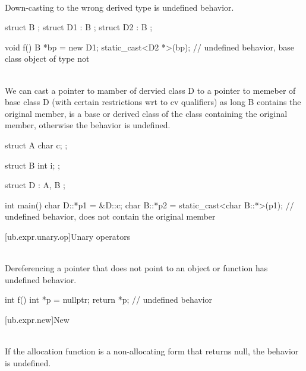 \pnum
{} \\
Down-casting to the wrong derived type is undefined behavior.

\pnum
\begin{example}
\begin{codeblock}
struct B {};
struct D1 : B {};
struct D2 : B {};

void f() {
  B *bp = new D1;
  static_cast<D2 *>(bp);        // undefined behavior, base class object of type  not 
}
\end{codeblock}
\end{example}

\pnum
{} \\
We can cast a pointer to mamber of dervied class D to a pointer to memeber of base class D (with certain restrictions wrt to cv qualifiers)
as long B contains the original member, is a base or derived class of the class containing the original member, otherwise the behavior is undefined.


\pnum
\begin{example}
\begin{codeblock}
struct A {
  char c;
};

struct B {
  int i;
};

struct D : A, B {};

int main() {
  char D::*p1 = &D::c;
  char B::*p2 = static_cast<char B::*>(p1); // undefined behavior,  does not contain the original member 
}
\end{codeblock}
\end{example}

[ub.expr.unary.op]{Unary operators}

\pnum
{} \\
Dereferencing a pointer that does not point to an object or function
has undefined behavior.

\pnum
\begin{example}
\begin{codeblock}
int f()
{
  int *p = nullptr;
  return *p;  // undefined behavior
}
\end{codeblock}
\end{example}


[ub.expr.new]{New}

\pnum
{} \\
If the allocation
function is a non-allocating form  that returns null, the behavior is undefined.

